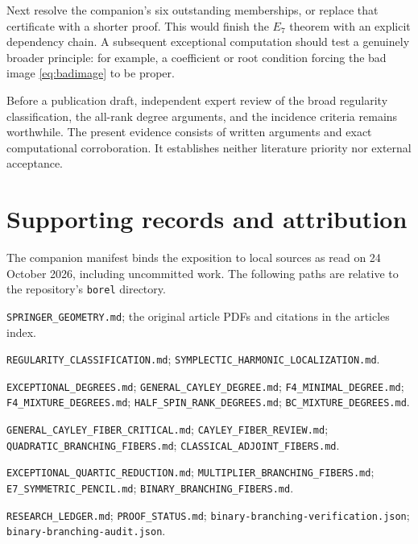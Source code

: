 \documentclass[11pt]{article}
\newcommand{\record}[1]{{\small\nolinkurl{#1}}}
\begin{document}
Next resolve the companion's six outstanding memberships, or replace that certificate with a shorter proof. This would finish the $E_7$ theorem with an explicit dependency chain. A subsequent exceptional computation should test a genuinely broader principle: for example, a coefficient or root condition forcing the bad image \eqref{eq:badimage} to be proper.

Before a publication draft, independent expert review of the broad regularity classification, the all-rank degree arguments, and the incidence criteria remains worthwhile. The present evidence consists of written arguments and exact computational corroboration. It establishes neither literature priority nor external acceptance.

\appendix
\section{Supporting records and attribution}

The companion manifest binds the exposition to local sources as read on 24 October 2026, including uncommitted work. The following paths are relative to the repository's \record{borel} directory.

\begin{description}[style=nextline]
\item[Maps and earlier papers]
\record{SPRINGER_GEOMETRY.md}; the original article PDFs and citations in the articles index.
\item[Regularity and separation]
\record{REGULARITY_CLASSIFICATION.md};
\record{SYMPLECTIC_HARMONIC_LOCALIZATION.md}.
\item[Degrees]
\record{EXCEPTIONAL_DEGREES.md};
\record{GENERAL_CAYLEY_DEGREE.md};
\record{F4_MINIMAL_DEGREE.md};
\record{F4_MIXTURE_DEGREES.md};
\record{HALF_SPIN_RANK_DEGREES.md};
\record{BC_MIXTURE_DEGREES.md}.
\item[General fibers and criteria]
\record{GENERAL_CAYLEY_FIBER_CRITICAL.md};
\record{CAYLEY_FIBER_REVIEW.md};
\record{QUADRATIC_BRANCHING_FIBERS.md};
\record{CLASSICAL_ADJOINT_FIBERS.md}.
\item[Exceptional progress]
\record{EXCEPTIONAL_QUARTIC_REDUCTION.md};
\record{MULTIPLIER_BRANCHING_FIBERS.md};
\record{E7_SYMMETRIC_PENCIL.md};
\record{BINARY_BRANCHING_FIBERS.md}.
\item[Status and checks]
\record{RESEARCH_LEDGER.md}; \record{PROOF_STATUS.md};
\record{binary-branching-verification.json};
\record{binary-branching-audit.json}.
\end{description}
\end{document}
